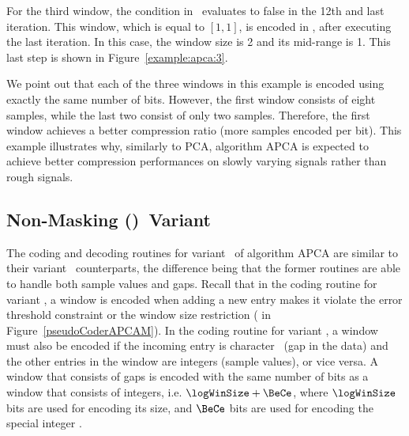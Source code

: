 For the third window, the condition in \Line \APCACodeOne\ evaluates to false in the 12th and last iteration. This window, which is equal to $[1, 1]$, is encoded in \Line \APCACodeTwo, after executing the last iteration. In this case, the window size is 2 and its mid-range is 1. This last step is shown in Figure~\ref{example:apca:3}.


\vspace{+5pt}


We point out that each of the three windows in this example is encoded using exactly the same number of bits. However, the first window consists of eight samples, while the last two consist of only two samples. Therefore, the first window achieves a better compression ratio (more samples encoded per bit). This example illustrates why, similarly to PCA, algorithm APCA is expected to achieve better compression performances on slowly varying signals rather than rough signals.




\clearpage
\subsection{Non-Masking (\NOmaskalgo)\ Variant}
\label{algo:apca:nmvariant}


The coding and decoding routines for variant \NOmaskalgo\ of algorithm APCA are similar to their variant \maskalgo\ counterparts, the difference being that the former routines are able to handle both sample values and gaps. Recall that in the coding routine for variant \maskalgo, a window is encoded when adding a new entry makes it violate the error threshold constraint or the window size restriction ( in Figure~\ref{pseudoCoderAPCAM}). In the coding routine for variant \NOmaskalgo, a window must also be encoded if the incoming entry is character \noData\ (gap in the data) and the other entries in the window are integers (sample values), or vice versa. A window that consists of gaps is encoded with the same number of bits as a window that consists of integers, i.e. $\logWinSize+\BeCe$, where $\logWinSize$ bits are used for encoding its size, and $\BeCe$ bits are used for encoding the special integer \nodata.


